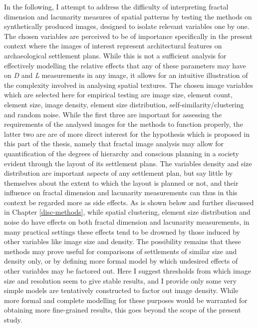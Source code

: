 \documentclass[
  12pt,
  a4paper, twoside]{book}
\begin{document}
In the following, I attempt to address the difficulty of interpreting fractal dimension and lacunarity measures of spatial patterns by testing the methods on synthetically produced images, designed to isolate relevant variables one by one. The chosen variables are perceived to be of importance specifically in the present context where the images of interest represent architectural features on archaeological settlement plans. While this is not a sufficient analysis for effectively modelling the relative effects that any of these parameters may have on \emph{D} and \emph{L} measurements in any image, it allows for an intuitive illustration of the complexity involved in analysing spatial textures. The chosen image variables which are selected here for empirical testing are image size, element count, element size, image density, element size distribution, self-similarity/clustering and random noise. While the first three are important for assessing the requirements of the analysed images for the methods to function properly, the latter two are are of more direct interest for the hypothesis which is proposed in this part of the thesis, namely that fractal image analysis may allow for quantification of the degrees of hierarchy and conscious planning in a society evident through the layout of its settlement plans. The variables density and size distribution are important aspects of any settlement plan, but say little by themselves about the extent to which the layout is planned or not, and their influence on fractal dimension and lacunarity measurements can thus in this context be regarded more as side effects. As is shown below and further discussed in Chapter \ref{disc-methods}, while spatial clustering, element size distribution and noise do have effects on both fractal dimension and lacunarity measurements, in many practical settings these effects tend to be drowned by those induced by other variables like image size and density. The possibility remains that these methods may prove useful for comparisons of settlements of similar size and density only, or by defining more formal model by which undesired effects of other variables may be factored out. Here I suggest thresholds from which image size and resolution seem to give stable results, and I provide only some very simple models are tentatively constructed to factor out image density. While more formal and complete modelling for these purposes would be warranted for obtaining more fine-grained results, this goes beyond the scope of the present study.
\end{document}
